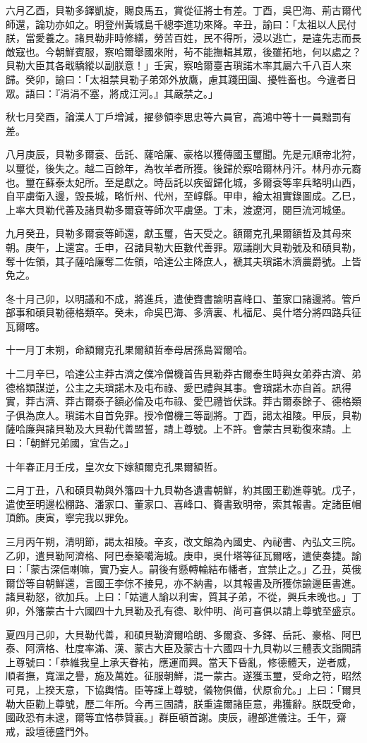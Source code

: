 \begin{pinyinscope}
六月乙酉，貝勒多鐸凱旋，賜良馬五，賞從征將士有差。丁酉，吳巴海、荊古爾代師還，論功亦如之。明登州黃城島千總李進功來降。辛丑，諭曰：「太祖以人民付朕，當愛養之。諸貝勒非時修繕，勞苦百姓，民不得所，浸以逃亡，是違先志而長敵寇也。今朝鮮賓服，察哈爾舉國來附，茍不能撫輯其眾，後雖拓地，何以處之？貝勒大臣其各戢驕縱以副朕意！」壬寅，察哈爾臺吉瑣諾木率其屬六千八百人來歸。癸卯，諭曰：「太祖禁貝勒子弟郊外放鷹，慮其踐田園、擾牲畜也。今違者日眾。語曰：『涓涓不塞，將成江河。』其嚴禁之。」

秋七月癸酉，論漢人丁戶增減，擢參領李思忠等六員官，高鴻中等十一員黜罰有差。

八月庚辰，貝勒多爾袞、岳託、薩哈廉、豪格以獲傳國玉璽聞。先是元順帝北狩，以璽從，後失之。越二百餘年，為牧羊者所獲。後歸於察哈爾林丹汗。林丹亦元裔也。璽在蘇泰太妃所。至是獻之。時岳託以疾留歸化城，多爾袞等率兵略明山西，自平虜衛入邊，毀長城，略忻州、代州，至崞縣。甲申，繪太祖實錄圖成。乙巳，上率大貝勒代善及諸貝勒多爾袞等師次平虜堡。丁未，渡遼河，閱巨流河城堡。

九月癸丑，貝勒多爾袞等師還，獻玉璽，告天受之。額爾克孔果爾額哲及其母來朝。庚午，上還宮。壬申，召諸貝勒大臣數代善罪。眾議削大貝勒號及和碩貝勒，奪十佐領，其子薩哈廉奪二佐領，哈達公主降庶人，褫其夫瑣諾木濟農爵號。上皆免之。

冬十月己卯，以明議和不成，將進兵，遣使賚書諭明喜峰口、董家口諸邊將。管戶部事和碩貝勒德格類卒。癸未，命吳巴海、多濟裏、札福尼、吳什塔分將四路兵征瓦爾喀。

十一月丁未朔，命額爾克孔果爾額哲奉母居孫島習爾哈。

十二月辛巳，哈達公主莽古濟之僕冷僧機首告貝勒莽古爾泰生時與女弟莽古濟、弟德格類謀逆，公主之夫瑣諾木及屯布祿、愛巴禮與其事。會瑣諾木亦自首。訊得實，莽古濟、莽古爾泰子額必倫及屯布祿、愛巴禮皆伏誅。莽古爾泰餘子、德格類子俱為庶人。瑣諾木自首免罪。授冷僧機三等副將。丁酉，謁太祖陵。甲辰，貝勒薩哈廉與諸貝勒及大貝勒代善盟誓，請上尊號。上不許。會蒙古貝勒復來請。上曰：「朝鮮兄弟國，宜告之。」

十年春正月壬戌，皇次女下嫁額爾克孔果爾額哲。

二月丁丑，八和碩貝勒與外籓四十九貝勒各遺書朝鮮，約其國王勸進尊號。戊子，遣使至明邊松棚路、潘家口、董家口、喜峰口、賚書致明帝，索其報書。定諸臣帽頂飾。庚寅，寧完我以罪免。

三月丙午朔，清明節，謁太祖陵。辛亥，改文館為內國史、內祕書、內弘文三院。乙卯，遣貝勒阿濟格、阿巴泰築噶海城。庚申，吳什塔等征瓦爾喀，遣使奏捷。諭曰：「蒙古深信喇嘛，實乃妄人。嗣後有懸轉輪結布幡者，宜禁止之。」乙丑，英俄爾岱等自朝鮮還，言國王李倧不接見，亦不納書，以其報書及所獲倧諭邊臣書進。諸貝勒怒，欲加兵。上曰：「姑遣人諭以利害，質其子弟，不從，興兵未晚也。」丁卯，外籓蒙古十六國四十九貝勒及孔有德、耿仲明、尚可喜俱以請上尊號至盛京。

夏四月己卯，大貝勒代善，和碩貝勒濟爾哈朗、多爾袞、多鐸、岳託、豪格、阿巴泰、阿濟格、杜度率滿、漢、蒙古大臣及蒙古十六國四十九貝勒以三體表文詣闕請上尊號曰：「恭維我皇上承天眷祐，應運而興。當天下昏亂，修德體天，逆者威，順者撫，寬溫之譽，施及萬姓。征服朝鮮，混一蒙古。遂獲玉璽，受命之符，昭然可見，上揆天意，下協輿情。臣等謹上尊號，儀物俱備，伏原俞允。」上曰：「爾貝勒大臣勸上尊號，歷二年所。今再三固請，朕重違爾諸臣意，弗獲辭。朕既受命，國政恐有未逮，爾等宜恪恭贊襄。」群臣頓首謝。庚辰，禮部進儀注。壬午，齋戒，設壇德盛門外。


\end{pinyinscope}